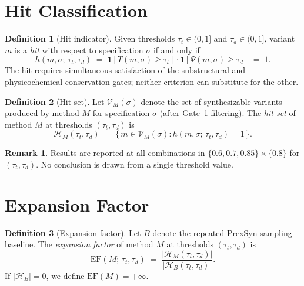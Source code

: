 \documentclass[11pt, a4paper]{article}
\theoremstyle{definition}
\newtheorem{definition}{Definition}[section]
\newtheorem{remark}{Remark}[section]
\newcommand{\1}[1]{\mathbf{1}\!\left[#1\right]}   %
\newcommand{\Hit}{\mathcal{H}}                      %
\newcommand{\Var}{\mathcal{V}}                      %
\begin{document}
\section{Hit Classification}
\label{sec:hit}

\begin{definition}[Hit indicator]
\label{def:hit}
Given thresholds $\tau_t \in (0,1]$ and $\tau_d \in (0,1]$, variant $m$
is a \emph{hit} with respect to specification $\sigma$ if and only if
\[
  h(m, \sigma;\, \tau_t, \tau_d)
  \;=\; \1{T(m, \sigma) \geq \tau_t}
        \cdot
        \1{\Psi(m, \sigma) \geq \tau_d}
  \;=\; 1.
\]
The hit requires simultaneous satisfaction of the substructural and
physicochemical conservation gates; neither criterion can substitute for
the other.
\end{definition}

\begin{definition}[Hit set]
\label{def:hitset}
Let $\Var_M(\sigma)$ denote the set of synthesizable variants produced by
method $M$ for specification $\sigma$ (after Gate~1 filtering).
The \emph{hit set} of method $M$ at thresholds $(\tau_t, \tau_d)$ is
\[
  \Hit_M(\tau_t, \tau_d)
  \;=\; \bigl\{\, m \in \Var_M(\sigma)
               : h(m, \sigma;\, \tau_t, \tau_d) = 1 \,\bigr\}.
\]
\end{definition}

\begin{remark}
Results are reported at all combinations in
$\{0.6, 0.7, 0.85\} \times \{0.8\}$ for $(\tau_t, \tau_d)$.
No conclusion is drawn from a single threshold value.
\end{remark}


\section{Expansion Factor}
\label{sec:expansion}

\begin{definition}[Expansion factor]
\label{def:expansion}
Let $B$ denote the repeated-PrexSyn-sampling baseline.
The \emph{expansion factor} of method $M$ at thresholds $(\tau_t, \tau_d)$ is
\[
  \text{EF}(M;\, \tau_t, \tau_d)
  \;=\; \frac{|\Hit_M(\tau_t, \tau_d)|}{|\Hit_B(\tau_t, \tau_d)|}.
\]
If $|\Hit_B| = 0$, we define $\text{EF}(M) = +\infty$.
\end{definition}
\end{document}
